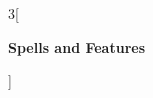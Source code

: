 \documentclass[12pt]{article}
\begin{document}
\raggedright
\newcommand\bracket[1]{$\langle${#1}$\rangle$}
\def\sam{\bracket{\footnotesize\textsc{Spell ability modifier}}}
\def\spelldc{\bracket{\footnotesize\textsc{Spell DC}}}
\def\spellattack{\bracket{\footnotesize\textsc{Spell Attack}}}
\def\ssatk{~\spellattack}
\def\psatk{+\spellattack}
\def\psam{+\sam}
\columnsep=25pt
\begin{multicols}{3}[\begin{center}\LARGE \textbf{Spells and Features} \end{center}]

\end{multicols}
\end{document}
